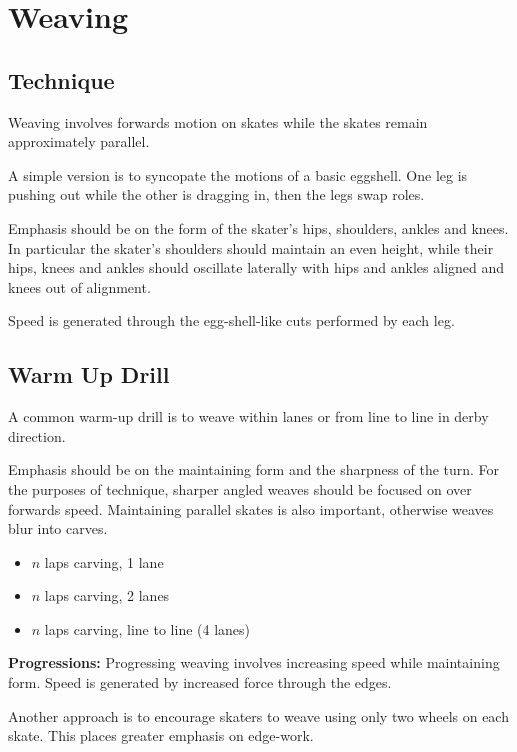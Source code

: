 \section{Weaving}
\label{sec:sticky/weaves}

\subsection{Technique}

Weaving involves forwards motion on skates while the skates remain approximately parallel.   

A simple version is to syncopate the motions of a basic eggshell.  
One leg is pushing out while the other is dragging in, then the legs swap roles. 

Emphasis should be on the form of the skater's hips, shoulders, ankles and knees. 
In particular the skater's shoulders should maintain an even height, while their hips, knees and ankles should oscillate laterally with hips and ankles aligned and knees out of alignment.    

Speed is generated through the egg-shell-like cuts performed by each leg.   

\subsection{Warm Up Drill}


A common warm-up drill is to weave within lanes or from line to line in derby direction.

Emphasis should be on the maintaining form and the sharpness of the turn. 
For the purposes of technique, sharper angled weaves should be focused on over forwards speed.
Maintaining parallel skates is also important, otherwise weaves blur into carves. 

\begin{itemize}
\item $n$ laps carving, 1 lane 
\item $n$ laps carving, 2 lanes
\item $n$ laps carving, line to line (4 lanes)
\end{itemize}


{\bf Progressions:}
Progressing weaving involves increasing speed while maintaining form.   
Speed is generated by increased force through the edges.  

Another approach is to encourage skaters to weave using only two wheels on each skate. This places greater emphasis on edge-work. 

